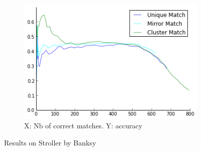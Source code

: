 \documentclass{article}
\begin{document}
\begin{figure}
{\begin{subfigure}[t]{0.35\textwidth}
			\centering
			\includegraphics[width=\textwidth]{images/result_banksy_stroller}
			\caption{X: Nb of correct matches. Y: accuracy}
			\label{fig:result_stroller}
		\end{subfigure}%
	}%
	\label{fig:stroller}
	\caption{Results on Stroller by Banksy}
\end{figure}
\end{document}
